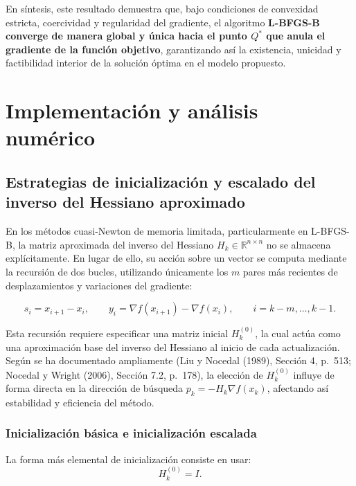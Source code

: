 \documentclass[
  spanish,
  us-letterpaper,
]{scrreprt}
\numberwithin{equation}{section}
\begin{document}
En síntesis, este resultado demuestra que, bajo condiciones de
convexidad estricta, coercividad y regularidad del gradiente, el
algoritmo \textbf{L-BFGS-B converge de manera global y única hacia el
punto \(Q^*\) que anula el gradiente de la función objetivo},
garantizando así la existencia, unicidad y factibilidad interior de la
solución óptima en el modelo propuesto.

\section{Implementación y análisis
numérico}\label{implementaciuxf3n-y-anuxe1lisis-numuxe9rico}

\subsection{Estrategias de inicialización y escalado del inverso del
Hessiano
aproximado}\label{estrategias-de-inicializaciuxf3n-y-escalado-del-inverso-del-hessiano-aproximado}

En los métodos cuasi-Newton de memoria limitada, particularmente en
L-BFGS-B, la matriz aproximada del inverso del Hessiano
\(H_k \in \mathbb{R}^{n \times n}\) no se almacena explícitamente. En
lugar de ello, su acción sobre un vector se computa mediante la
recursión de dos bucles, utilizando únicamente los \(m\) pares más
recientes de desplazamientos y variaciones del gradiente:

\[
s_i = x_{i+1}-x_i,
\qquad
y_i = \nabla f(x_{i+1}) - \nabla f(x_i),
\qquad
i = k-m,\dots,k-1.
\]

Esta recursión requiere especificar una matriz inicial \(H_k^{(0)}\), la
cual actúa como una aproximación base del inverso del Hessiano al inicio
de cada actualización. Según se ha documentado ampliamente (Liu y
Nocedal (1989), Sección 4, p.~513; Nocedal y Wright (2006), Sección 7.2,
p.~178), la elección de \(H_k^{(0)}\) influye de forma directa en la
dirección de búsqueda \(p_k = -H_k \nabla f(x_k)\), afectando así
estabilidad y eficiencia del método.

\subsubsection{Inicialización básica e inicialización
escalada}\label{inicializaciuxf3n-buxe1sica-e-inicializaciuxf3n-escalada}

La forma más elemental de inicialización consiste en usar: \[
H_k^{(0)} = I.
\]
\end{document}
